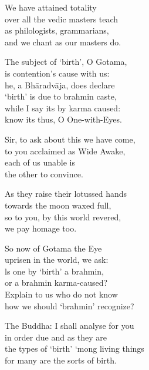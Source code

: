 \begin{MyDescription}{}
We have attained totality\\
over all the vedic masters teach\\
as philologists, grammarians,\\
and we chant as our masters do.
\end{MyDescription}

\begin{MyDescription}{}
The subject of `birth', O Gotama,\\
is contention's cause with us:\\
he, a Bh\=aradv\=aja, does declare\\
`birth' is due to brahmin caste,\\
while I say its by karma caused:\\
know its thus, O One-with-Eyes.
\end{MyDescription}

\begin{MyDescription}{}
Sir, to ask about this we have come,\\
to you acclaimed as Wide Awake,\\
each of us unable is\\
the other to convince.
\end{MyDescription}

\begin{MyDescription}{}
As they raise their lotussed hands\\
towards the moon waxed full,\\
so to you, by this world revered,\\
we pay homage too.
\end{MyDescription}

\begin{MyDescription}{}
So now of Gotama the Eye\\
uprisen in the world, we ask:\\
ls one by `birth' a brahmin,\\
or a brahmin karma-caused?\\
Explain to us who do not know\\
how we should `brahmin' recognize?
\end{MyDescription}

\begin{MyDescription}{The Buddha:}
I shall analyse for you\\
in order due and as they are\\
the types of `birth' `mong living things\\
for many are the sorts of birth.
\end{MyDescription}

